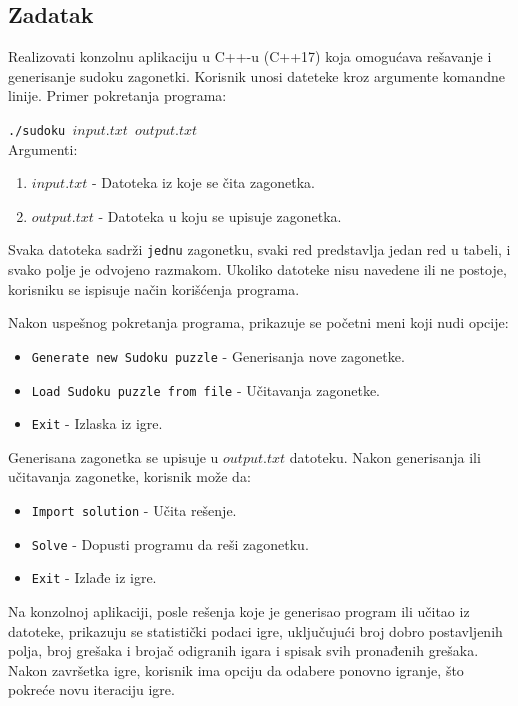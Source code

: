 \documentclass[a4paper]{article}
\begin{document}
    \subsection{Zadatak}
    Realizovati konzolnu aplikaciju u C++-u (C++17) koja omogućava rešavanje i generisanje sudoku zagonetki. Korisnik unosi dateteke kroz argumente komandne linije. 
    Primer pokretanja programa:
    \par\texttt{./sudoku $input.txt$ $output.txt$}\\
    Argumenti:
    \begin{enumerate}
        \item $input.txt$ - Datoteka iz koje se čita zagonetka.
        \item $output.txt$ - Datoteka u koju se upisuje zagonetka.
    \end{enumerate}
    \par Svaka datoteka sadrži \texttt{jednu} zagonetku, svaki red predstavlja jedan red u tabeli, i svako polje je odvojeno razmakom. Ukoliko datoteke nisu navedene ili ne postoje,
    korisniku se ispisuje način korišćenja programa.
    \par Nakon uspešnog pokretanja programa, prikazuje se početni meni koji nudi opcije:
    \begin{itemize}
        \item \texttt{Generate new Sudoku puzzle} - Generisanja nove zagonetke.
        \item \texttt{Load Sudoku puzzle from file} - Učitavanja zagonetke.
        \item \texttt{Exit} - Izlaska iz igre.
    \end{itemize}
    Generisana zagonetka se upisuje u $output.txt$ datoteku.
    Nakon generisanja ili učitavanja zagonetke, korisnik može da:
    \begin{itemize}
        \item \texttt{Import solution} - Učita rešenje.
        \item \texttt{Solve} - Dopusti programu da reši zagonetku.
        \item \texttt{Exit} - Izlađe iz igre.
    \end{itemize}
    \par Na konzolnoj aplikaciji, posle rešenja koje je generisao program ili učitao iz datoteke, prikazuju se statistički podaci igre, uključujući broj dobro 
    postavljenih polja, broj grešaka i brojač odigranih igara i spisak svih pronađenih grešaka. Nakon završetka igre, korisnik ima opciju da odabere ponovno igranje, 
    što pokreće novu iteraciju igre.
    \newpage
\end{document}
